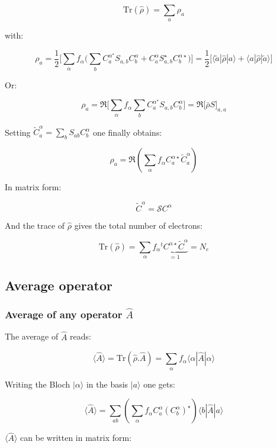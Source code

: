 \documentclass{article}
\newcommand{\bra}[1]{\langle #1|}
\newcommand{\ket}[1]{|#1\rangle}
\newcommand{\op}[1]{\hat{#1}}
\begin{document}
\[ \displaystyle \mbox{Tr}(\op{\rho})=\sum_{a} \rho_{a} \]

\noindent
with:

\[\rho_{a }=\frac{1}{2}\Bigg[\sum_{\alpha } f_{\alpha}
\Bigg( \sum_{b} C_{a}^{\alpha^{\star}}S_{a,b}C_{b}^{\alpha}+ C_{a}^{\alpha}S_{a,b}^{\star}
C_{b}^{\alpha \star} \Bigg)\Bigg]= 
\frac{1}{2} \Big[ \bra{\tilde{a}} \op{\rho} \ket{a} + \bra{a} \op{\rho} \ket{\tilde{a}}  \Big]\]

\noindent Or:

\[\rho_{a}=\Re \Bigg[\sum_{\alpha} f_{\alpha}
\sum_{b} C_{a}^{\alpha^{\star}}S_{a,b}C_{b}^{\alpha}\Bigg]
= \Re \Bigg[\bar{\rho}S \Bigg]_{a,a}\]


\noindent
Setting $\displaystyle \widetilde{C}_{a}^{\alpha}=\sum_{b } S_{ab} C_{b}^{\alpha}$
\noindent
one finally obtains:

\[\displaystyle \rho_{a}= \Re \left( \sum_{\alpha} f_{\alpha} C_{a}^{\alpha \star}\widetilde{C}_{a}^{\alpha }
 \right)\]

\noindent
In matrix form:

\[ \widetilde{C}^{\alpha}=\mathcal{S}C^{\alpha} \]

\noindent
And the trace of $\op{\rho}$ gives the total number of electrons:

\[ \mbox{Tr} (\op{\rho })= \sum_{\alpha } f_{\alpha}
\underbrace{^tC^{\alpha \star}\widetilde{C}^{\alpha}}_{=1} =N_e\]

\subsection{Average operator}


\subsubsection{Average of any operator $\op{A}$}


\noindent The average of $\op{A}$ reads:

\[ \langle \op{A} \rangle =\mbox{Tr} (\op{\rho}.\op{A})=\sum_{\alpha}f_{\alpha}
\bra{\alpha}\op{A}\ket{\alpha}\]

\noindent
Writing the Bloch $\ket{\alpha}$ in the basis $\ket{a}$ one gets:


\[ \displaystyle  \langle\op{A}\rangle=  \sum_{a  b} 
\left( \sum_{\alpha}  f_{\alpha}
C_{a }^{\alpha}(C_{b}^{\alpha})^{\star} \right)   
\bra{ b } \op{A} \ket{a} \]


\noindent
$\langle\op{A}  \rangle$ can be written in matrix form:
\end{document}
